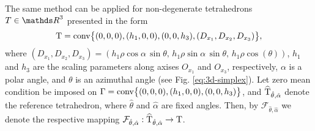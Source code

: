 The same method can be 
applied for non-degenerate tetrahedrons $T\in \Rthree$ presented in the form
%
\begin{equation}
    \T = {\rm conv} \big \{(0, 0, 0), (h_1, 0, 0), (0, 0, h_3), (D_{x_1}, D_{x_2}, D_{x_3}) \big\},
    \label{eq:arbitrary-tetrahedron}
\end{equation}
%
where
$(D_{x_1}, D_{x_2}, D_{x_3}) =
(h_1 \rho \cos\alpha \, \sin\theta, \,
 h_1 \rho \sin\alpha \, \sin\theta, \,
 h_1 \rho \cos(\theta))$, $h_1$ and $h_3$ are the scaling parameters along axises 
$O_{x_1}$ and $O_{x_3}$, respectively, 
$\alpha$ is a polar angle, and $\theta$ is an azimuthal angle
(see Fig. \ref{eq:3d-simplex}).  
Let zero mean condition be imposed on 
%
$\Gamma = {\rm conv} \big \{(0, 0, 0), (h_1, 0, 0), (0, 0, h_3) \big\}$,
%
and $\widehat{\mathrm{T}}_{\hat{\theta}, \hat{\alpha}}$ denote  the reference tetrahedron, where 
$\hat{\theta}$ and $\hat{\alpha}$ are fixed angles.
Then, by $\mathcal{F}_{\hat{\theta}, \hat{\alpha}}$ we denote the respective mapping 
$\mathcal{F}_{\hat{\theta}, \hat{\alpha}}: 
\widehat{\mathrm{T}}_{\hat{\theta}, \hat{\alpha}} \rightarrow \mathrm{T}$.
%
%
